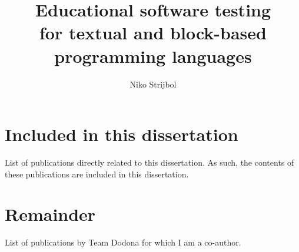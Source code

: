 \documentclass[
    paper=240mm:170mm,
    paper=portrait,
    parskip=half,
    cleardoublepage=plain,
    toc=chapterentrywithdots,
    chapterprefix=true,
    captions=tableheading,
    fontsize=10pt,
    mpinclude=true,
    DIV=13,
    BCOR=10mm
]{scrbook}
\author{Niko Strijbol}
\title{Educational software testing\\for textual and block-based programming languages}
\renewcommand*{\bibfont}{\normalfont\small}
\begin{document}
\frontmatter

{
    \selectfont\panno
    \maketitle
}








\tableofcontents


\begin{refcontext}[sorting=dnt]
    \renewcommand*{\mkbibcompletename}[1]{\ifitemannotation{me}{\textbf{#1}}{#1}}
    \nocite{strijbolBlinkEducationalSoftware2023,strijbolBlinkEducationalSoftware2024,strijbolTESTedDSLDomainspecificLanguage2024,strijbolTESTedEducationalTesting2023,vanpetegemDodonaLearnCode2023,vanpetegemPassFailPrediction2023,maertensDiscoveringExploringCases2024,maertensDolosLanguageagnosticPlagiarism2022}
    \renewcommand*{\bibfont}{\normalfont\normalsize}
    \setlength{\bibitemsep}{\itemsep}
    \togglefalse{abx@bool@giveninits}
    \section*{Included in this dissertation}\label{sec:included-in-this-dissertation}
    List of publications directly related to this dissertation.
    As such, the contents of these publications are included in this dissertation.
    \printbibliography[keyword={supermine},heading=none]
    \newpage
    \section*{Remainder}\label{sec:remainder}
    List of publications by Team Dodona for which I am a co-author.
    \printbibliography[keyword={mine},heading=none]
\end{refcontext}
\end{document}
